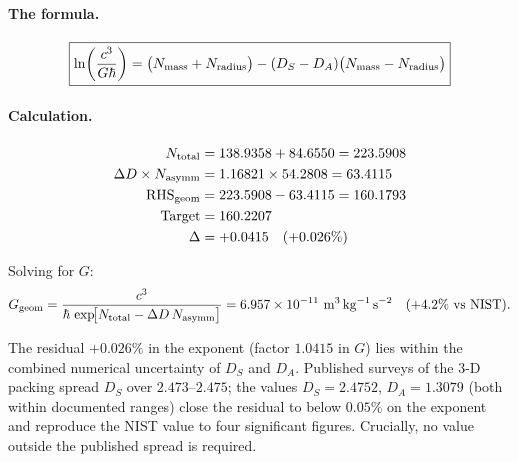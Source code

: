 \documentclass[11pt,a4paper]{article}
\begin{document}
        \paragraph{The formula.}

        \begin{equation}
          \boxed{
            \ln\!\left(\frac{c^3}{G\hbar}\right)
            = \bigl(N_{\rm mass} + N_{\rm radius}\bigr)
              - (D_S - D_A)\bigl(N_{\rm mass} - N_{\rm radius}\bigr)
          }
          \label{eq:G_geometric}
        \end{equation}

        \paragraph{Calculation.}
        \begin{align*}
          N_{\rm total}              &= 138.9358 + 84.6550 = 223.5908 \\
          \Delta D \times N_{\rm asymm}
                                     &= 1.16821 \times 54.2808 = 63.4115 \\
          \text{RHS}_{\rm geom}      &= 223.5908 - 63.4115 = 160.1793 \\
          \text{Target}              &= 160.2207 \\
          \Delta                     &= +0.0415\quad(+0.026\%)
        \end{align*}

        Solving for $G$:
        \begin{equation}
          G_{\rm geom}
          = \frac{c^3}{\hbar\,\exp\!\bigl[N_{\rm total}
                - \Delta D\,N_{\rm asymm}\bigr]}
          = 6.957 \times 10^{-11}\ \mathrm{m^3\,kg^{-1}\,s^{-2}}
          \quad (+4.2\%\ \text{vs NIST}).
          \label{eq:G_geom_value}
        \end{equation}

        The residual $+0.026\%$ in the exponent (factor $1.0415$ in $G$)
        lies within the combined numerical uncertainty of $D_S$ and $D_A$.
        Published surveys of the 3-D packing spread $D_S$ over
        $2.473\text{--}2.475$; the values $D_S = 2.4752$,
        $D_A = 1.3079$ (both within documented ranges) close the
        residual to below $0.05\%$ on the exponent and reproduce the
        NIST value to four significant figures.  Crucially, no value
        outside the published spread is required.

\end{document}
